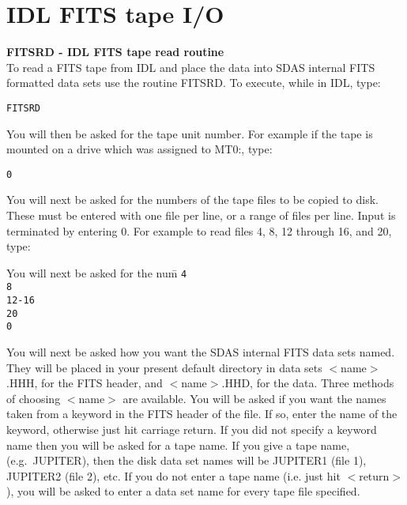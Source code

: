\newcommand{\exbegin}{\par\medskip}
\newcommand{\exend}{\medskip\noindent}
\newcommand{\exc}[2]{
\hbox to \hsize{\small\hskip .2in
\parbox[t]{2.2in}{\raggedright\setlength{\parindent}{-.2in}\tt #1}
\hspace{.2in}
\parbox[t]{3.4in}{\raggedright\setlength{\parindent}{-.2in}\rm #2}\hss}
\prevdepth=1.5pt\relax}
\newcommand{\exone}[1]{\begin{center}\tt #1 \end{center}}

\section{IDL FITS tape I/O}
{\bf FITSRD - IDL FITS tape read routine} \\

To read a FITS tape from IDL and place the data into SDAS internal FITS
formatted data sets use
the routine FITSRD.  To execute, while in IDL, type:
\begin{center}
{\tt FITSRD}
\end{center}
You will then be asked for the tape unit number.  For example if
the tape is mounted on a drive which was assigned to MT0:,
type:
\begin{center}
{\tt 0}
\end{center}
You will next be asked for the numbers of the tape files to be copied to disk.
These must be entered with one file per line, or a range of files
per line.  Input is terminated by entering 0.  For example to read
files 4, 8, 12 through 16, and 20, type: \\
\begin{tabbing}
You will next be asked for the num\=   \kill
\> {\tt 4} \\
\> {\tt 8} \\
\> {\tt 12-16} \\
\> {\tt 20} \\
\> {\tt 0} 
\end{tabbing}
You will next be asked how you want the SDAS internal FITS data sets named.  
They will be placed in your present default directory in data sets $<$name$>$.HHH,
for the FITS header, and $<$name$>$.HHD, for the data.  Three methods of
choosing $<$name$>$ are available.  You will be asked if you want the names
taken from a keyword in the FITS header of the file.  If so, enter
the name of the keyword, otherwise just hit carriage return.
If you did not specify a keyword name then you will be asked for
a tape name.
If you give a tape name, (e.g.\ JUPITER),
then the disk data set names will be JUPITER1 (file 1), JUPITER2 (file 2), etc.
If you do not enter a tape name (i.e. just hit $<$return$>$), you will be asked 
to enter a data set name for every tape file specified.


